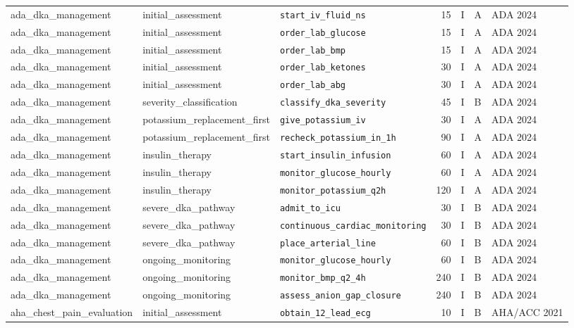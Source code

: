 \begin{longtable}{lllrrll}
ada\_dka\_management & initial\_assessment & \texttt{start\_iv\_fluid\_ns} & 15 & I & A & ADA 2024 \\
ada\_dka\_management & initial\_assessment & \texttt{order\_lab\_glucose} & 15 & I & A & ADA 2024 \\
ada\_dka\_management & initial\_assessment & \texttt{order\_lab\_bmp} & 15 & I & A & ADA 2024 \\
ada\_dka\_management & initial\_assessment & \texttt{order\_lab\_ketones} & 30 & I & A & ADA 2024 \\
ada\_dka\_management & initial\_assessment & \texttt{order\_lab\_abg} & 30 & I & A & ADA 2024 \\
ada\_dka\_management & severity\_classification & \texttt{classify\_dka\_severity} & 45 & I & B & ADA 2024 \\
ada\_dka\_management & potassium\_replacement\_first & \texttt{give\_potassium\_iv} & 30 & I & A & ADA 2024 \\
ada\_dka\_management & potassium\_replacement\_first & \texttt{recheck\_potassium\_in\_1h} & 90 & I & A & ADA 2024 \\
ada\_dka\_management & insulin\_therapy & \texttt{start\_insulin\_infusion} & 60 & I & A & ADA 2024 \\
ada\_dka\_management & insulin\_therapy & \texttt{monitor\_glucose\_hourly} & 60 & I & A & ADA 2024 \\
ada\_dka\_management & insulin\_therapy & \texttt{monitor\_potassium\_q2h} & 120 & I & A & ADA 2024 \\
ada\_dka\_management & severe\_dka\_pathway & \texttt{admit\_to\_icu} & 30 & I & B & ADA 2024 \\
ada\_dka\_management & severe\_dka\_pathway & \texttt{continuous\_cardiac\_monitoring} & 30 & I & B & ADA 2024 \\
ada\_dka\_management & severe\_dka\_pathway & \texttt{place\_arterial\_line} & 60 & I & B & ADA 2024 \\
ada\_dka\_management & ongoing\_monitoring & \texttt{monitor\_glucose\_hourly} & 60 & I & B & ADA 2024 \\
ada\_dka\_management & ongoing\_monitoring & \texttt{monitor\_bmp\_q2\_4h} & 240 & I & B & ADA 2024 \\
ada\_dka\_management & ongoing\_monitoring & \texttt{assess\_anion\_gap\_closure} & 240 & I & B & ADA 2024 \\
aha\_chest\_pain\_evaluation & initial\_assessment & \texttt{obtain\_12\_lead\_ecg} & 10 & I & B & AHA/ACC 2021 \\

\end{longtable}
